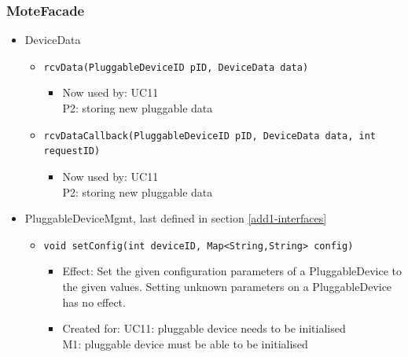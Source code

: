     \subsubsection{MoteFacade}
        \begin{itemize}
            \item DeviceData
            \begin{itemize}
                \item \texttt{rcvData(PluggableDeviceID pID, DeviceData data)}
                    \begin{itemize}
                        \item Now used by: UC11 \\
                              P2: storing new pluggable data
                    \end{itemize}
                \item \texttt{rcvDataCallback(PluggableDeviceID pID, DeviceData data, int requestID)}
                    \begin{itemize}
                        \item Now used by: UC11 \\
                              P2: storing new pluggable data
                    \end{itemize}
            \end{itemize}

            \item PluggableDeviceMgmt, last defined in section \ref{add1-interfaces}
            \begin{itemize}
                \item \texttt{void setConfig(int deviceID, Map<String,String> config)}
                \begin{itemize}
                    \item Effect: Set the given configuration parameters of a
                          PluggableDevice to the given values. Setting unknown parameters
                          on a PluggableDevice has no effect.
                    \item Created for: UC11: pluggable device needs to be initialised \\
                          M1: pluggable device must be able to be initialised
                \end{itemize}
            \end{itemize}
        \end{itemize}

